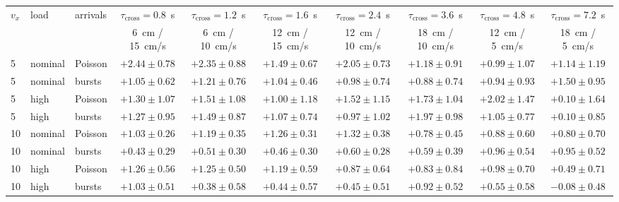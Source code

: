 \begin{tabular}{@{}lllccccccc@{}}
\toprule
$v_x$ & load & arrivals & $\tau_{\mathrm{cross}}=0.8$~s & $\tau_{\mathrm{cross}}=1.2$~s & $\tau_{\mathrm{cross}}=1.6$~s & $\tau_{\mathrm{cross}}=2.4$~s & $\tau_{\mathrm{cross}}=3.6$~s & $\tau_{\mathrm{cross}}=4.8$~s & $\tau_{\mathrm{cross}}=7.2$~s \\
 & & & 6~cm / 15~cm/s & 6~cm / 10~cm/s & 12~cm / 15~cm/s & 12~cm / 10~cm/s & 18~cm / 10~cm/s & 12~cm / 5~cm/s & 18~cm / 5~cm/s \\
\midrule
5 & nominal & Poisson & {\boldmath$+2.44 \pm 0.78$} & {\boldmath$+2.35 \pm 0.88$} & {\boldmath$+1.49 \pm 0.67$} & {\boldmath$+2.05 \pm 0.73$} & $+1.18 \pm 0.91$ & $+0.99 \pm 1.07$ & $+1.14 \pm 1.19$ \\
5 & nominal & bursts & $+1.05 \pm 0.62$ & $+1.21 \pm 0.76$ & {\boldmath$+1.04 \pm 0.46$} & $+0.98 \pm 0.74$ & $+0.88 \pm 0.74$ & $+0.94 \pm 0.93$ & {\boldmath$+1.50 \pm 0.95$} \\
5 & high & Poisson & $+1.30 \pm 1.07$ & $+1.51 \pm 1.08$ & $+1.00 \pm 1.18$ & $+1.52 \pm 1.15$ & {\boldmath$+1.73 \pm 1.04$} & {\boldmath$+2.02 \pm 1.47$} & $+0.10 \pm 1.64$ \\
5 & high & bursts & $+1.27 \pm 0.95$ & {\boldmath$+1.49 \pm 0.87$} & $+1.07 \pm 0.74$ & $+0.97 \pm 1.02$ & {\boldmath$+1.97 \pm 0.98$} & $+1.05 \pm 0.77$ & $+0.10 \pm 0.85$ \\
\midrule
10 & nominal & Poisson & {\boldmath$+1.03 \pm 0.26$} & {\boldmath$+1.19 \pm 0.35$} & {\boldmath$+1.26 \pm 0.31$} & {\boldmath$+1.32 \pm 0.38$} & $+0.78 \pm 0.45$ & $+0.88 \pm 0.60$ & $+0.80 \pm 0.70$ \\
10 & nominal & bursts & $+0.43 \pm 0.29$ & $+0.51 \pm 0.30$ & $+0.46 \pm 0.30$ & $+0.60 \pm 0.28$ & $+0.59 \pm 0.39$ & $+0.96 \pm 0.54$ & $+0.95 \pm 0.52$ \\
10 & high & Poisson & {\boldmath$+1.26 \pm 0.56$} & {\boldmath$+1.25 \pm 0.50$} & {\boldmath$+1.19 \pm 0.59$} & $+0.87 \pm 0.64$ & $+0.83 \pm 0.84$ & $+0.98 \pm 0.70$ & $+0.49 \pm 0.71$ \\
10 & high & bursts & {\boldmath$+1.03 \pm 0.51$} & $+0.38 \pm 0.58$ & $+0.44 \pm 0.57$ & $+0.45 \pm 0.51$ & $+0.92 \pm 0.52$ & $+0.55 \pm 0.58$ & $-0.08 \pm 0.48$ \\
\bottomrule
\end{tabular}
